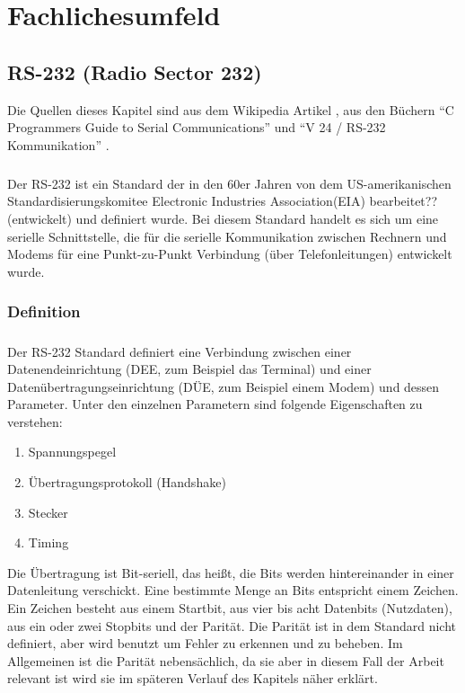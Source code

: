 \chapter{Fachlichesumfeld}\label{chp:fachlichesumfeld}

\section{RS-232 (Radio Sector 232)}

Die Quellen dieses Kapitel sind aus dem Wikipedia Artikel \cite{RS232}, aus den Büchern "`C Programmers Guide to Serial Communications"' \cite{CProgrammersGuide} und "`V 24 / RS-232 Kommunikation"' \cite{V24/RS232}.

\paragraph{}
Der RS-232 ist ein Standard der in den 60er Jahren von dem US-amerikanischen Standardisierungskomitee Electronic Industries Association(EIA) bearbeitet?? (entwickelt) und definiert wurde. Bei diesem Standard handelt es sich um eine serielle Schnittstelle, die für die serielle Kommunikation zwischen Rechnern und Modems für eine Punkt-zu-Punkt Verbindung (über Telefonleitungen) entwickelt wurde.


\subsection{Definition}
\paragraph{}

Der RS-232 Standard definiert eine Verbindung zwischen einer Datenendeinrichtung (DEE, zum Beispiel das Terminal) und einer Datenübertragungseinrichtung (DÜE, zum Beispiel einem Modem) und dessen Parameter. Unter den einzelnen Parametern sind folgende Eigenschaften zu verstehen:
\begin{enumerate}
\item Spannungspegel
\item Übertragungsprotokoll (Handshake)
\item Stecker
\item Timing
\end{enumerate}

Die Übertragung ist Bit-seriell, das heißt, die Bits werden hintereinander in einer Datenleitung verschickt. Eine bestimmte Menge an Bits entspricht einem Zeichen. Ein Zeichen besteht aus einem Startbit, aus vier bis acht Datenbits (Nutzdaten), aus ein oder zwei Stopbits und der Parität. Die Parität ist in dem Standard nicht definiert, aber wird benutzt um Fehler zu erkennen und zu beheben. Im Allgemeinen ist die Parität nebensächlich, da sie aber in diesem Fall der Arbeit relevant ist wird sie im späteren Verlauf des Kapitels näher erklärt.


